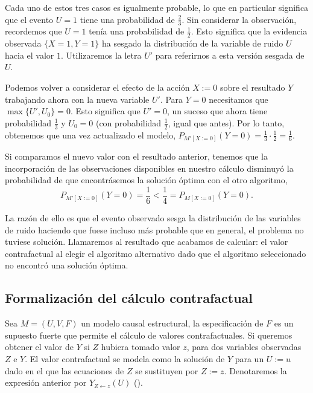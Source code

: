 \documentclass[oneside,openright,titlepage,numbers=noenddot,openany,headinclude,footinclude=true,
cleardoublepage=empty,abstractoff,BCOR=5mm,paper=a4,fontsize=12pt,main=spanish]{scrreprt}
\begin{document}
Cada uno de estos tres casos es igualmente probable, lo que en particular significa que el evento $U = 1$ tiene una probabilidad de $\frac{2}{3}$. Sin considerar la observación, recordemos que $U = 1$ tenía una probabilidad de $\frac{1}{2}$. Esto significa que la evidencia observada $\{X = 1, Y = 1\}$ ha sesgado la distribución de la variable de ruido $U$ hacia el valor $1$. Utilizaremos la letra $U'$ para referirnos a esta versión sesgada de $U$.

Podemos volver a considerar el efecto de la acción $X := 0$ sobre el resultado $Y$ trabajando ahora con la nueva variable $U'$. Para $Y = 0$ necesitamos que $\max \{U', U_0\} = 0$. Esto significa que $U' = 0$, un suceso que ahora tiene probabilidad $\frac{1}{3}$ y $U_0 = 0$ (con probabilidad $\frac{1}{2}$, igual que antes). Por lo tanto, obtenemos que una vez actualizado el modelo, $P_{M'[X:=0]}(Y = 0)=\frac{1}{3}\cdot \frac{1}{2}=\frac{1}{6}$.

Si comparamos el nuevo valor con el resultado anterior, tenemos que la incorporación de las observaciones disponibles en nuestro cálculo disminuyó la probabilidad de que encontrásemos la solución óptima con el otro algoritmo,
\begin{equation*}
    P_{M'[X:=0]}(Y = 0)=\frac{1}{6} < \frac{1}{4}=P_{M[X:=0]}(Y = 0).
\end{equation*}

La razón de ello es que el evento observado sesga la distribución de las variables de ruido haciendo que fuese incluso más probable que en general, el problema no tuviese solución. Llamaremos al resultado que acabamos de calcular: el valor contrafactual al elegir el algoritmo alternativo dado que el algoritmo seleccionado no encontró una solución óptima.


\subsection{Formalización del cálculo contrafactual}

Sea $M=(U,V,F)$ un modelo causal estructural, la especificación de $F$ es un supuesto fuerte que permite el cálculo de valores contrafactuales. Si queremos obtener el valor de $Y$ si $Z$ hubiera tomado valor $z$, para dos variables observadas $Z$ e $Y$. El valor contrafactual se modela como la solución de $Y$ para un $U := u$ dado en el que las ecuaciones de $Z$ se sustituyen por $Z := z$. Denotaremos la expresión anterior por $Y_{Z\leftarrow z}(U)$ (\cite{causality2000}).
\end{document}
